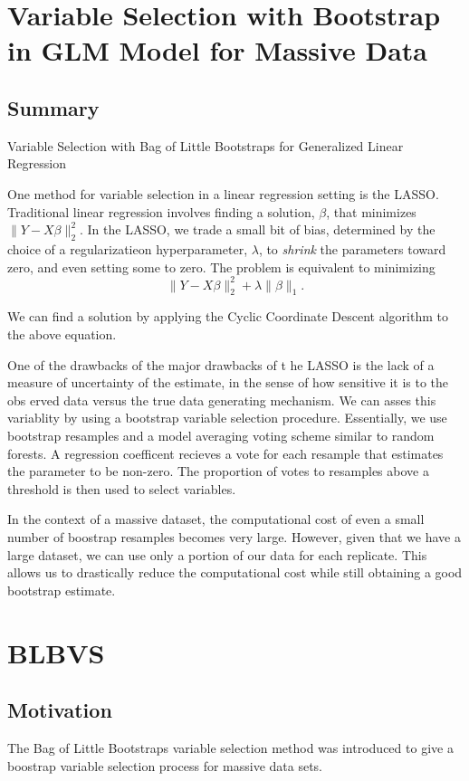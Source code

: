 \documentclass[11pt]{article}
\author{John Honaker}
\date{\today}
\title{}
\begin{document}
\tableofcontents


\section{Variable Selection with Bootstrap in GLM Model for Massive Data}
\label{sec:org50c6091}
\subsection{Summary}
\label{sec:orgc868e23}

Variable Selection with Bag of Little Bootstraps for Generalized Linear Regression

One method for variable selection in a linear regression setting is the LASSO. Traditional linear regression involves finding a solution, \(\beta\), that minimizes \(\| Y - X\beta \|^2_2\). In the LASSO, we trade a small bit of bias, determined by the choice of a regularizatieon hyperparameter, \(\lambda\), to \emph{shrink} the parameters toward zero, and even setting some to zero. The problem is equivalent to minimizing $$ \|Y - X\beta \|^2_2 + \lambda \| \beta \|_1.$$


We can find a solution by applying the Cyclic Coordinate Descent algorithm to the above equation.

   One of the drawbacks of the major drawbacks of t      \hline
he LASSO is the lack of a measure of uncertainty of the estimate, in the sense of how sensitive it is to the obs      \hline
erved data versus the true data generating mechanism. We can asses this variablity by using a bootstrap variable selection procedure. Essentially, we use bootstrap resamples and a model averaging voting scheme similar to random forests. A regression coefficent recieves a vote for each resample that estimates the parameter to be non-zero. The proportion of votes to resamples above a threshold is then used to select variables.

In the context of a massive dataset, the computational cost of even a small number of boostrap resamples becomes very large. However, given that we have a large dataset, we can use only a portion of our data for each replicate. This allows us to drastically reduce the computational cost while still obtaining a good bootstrap estimate.

\section{BLBVS}
\label{sec:org3f594a3}
\subsection{Motivation}
\label{sec:orgfc4c300}
The Bag of Little Bootstraps variable selection method was introduced to give a boostrap variable selection process for massive data sets.
\end{document}

